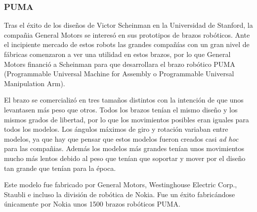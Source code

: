 \subsubsection{PUMA}

Tras el éxito de los diseños de Victor Scheinman en la Universidad de Stanford, la compañia General Motors se interesó en sus prototipos de brazos robóticos. Ante el incipiente mercado de estos robots las grandes compañías con un gran nivel de fábricas comenzaron a ver una utilidad en estos brazos, por lo que General Motors financió a Scheinman para que desarrollara el brazo robótico PUMA (Programmable Universal Machine for Assembly o Programmable Universal Manipulation Arm).

El brazo se comercializó en tres tamaños distintos con la intención de que unos levantasen más peso que otros. Todos los brazos tenían el mismo diseño y los mismos grados de libertad, por lo que los movimientos posibles eran iguales para todos los modelos. Los ángulos máximos de giro y rotación variaban entre modelos, ya que hay que pensar que estos modelos fueron creados casi \textit{ad hoc} para las compañias. Además los modelos más grandes tenían unos movimientos mucho más lentos debido al peso que tenían que soportar y mover por el diseño tan grande que tenían para la época.

Este modelo fue fabricado por General Motors, Westinghouse Electric Corp., Staubli e incluso la división de robótica de Nokia. Fue un éxito fabricándose únicamente por Nokia unos 1500 brazos robóticos PUMA. 
